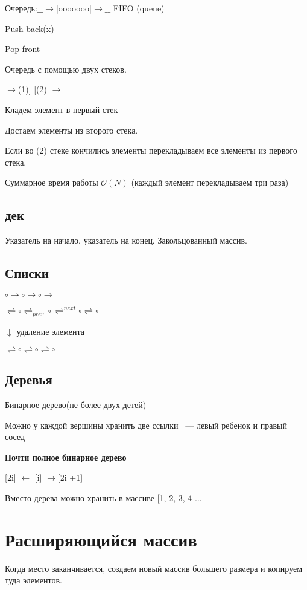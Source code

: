 \documentclass[12pt]{article}
\def\O{\mathcal{O}}
\begin{document}
Очередь:$\_\_\to$|ooooooo|$\to\_\_$  FIFO (queue)

Push$\_$back(x)

Pop$\_$front

Очередь с помощью двух стеков.

{$\to$}(1)]  [(2) $\to$


Кладем элемент в первый стек

Достаем элементы из второго стека. 

Если во (2) стеке  кончились элементы перекладываем все элементы из первого стека.

Суммарное время работы $\O(N)$ (каждый элемент перекладываем три раза)

\subsection{дек}

Указатель на начало, указатель на конец. Закольцованный массив.

\subsection{Списки}

$\circ \to \circ \to \circ \to$

$\rightleftharpoons \circ \rightleftharpoons_{prev} \circ \rightleftharpoons^{next} \circ \rightleftharpoons \circ$

$\downarrow$ удаление элемента

$\rightleftharpoons \circ \rightleftharpoons \circ \rightleftharpoons \circ$

\subsection{Деревья}
Бинарное дерево(не более двух детей)


Можно у каждой вершины хранить две ссылки ~--- левый ребенок и правый сосед

{\bf Почти полное бинарное дерево}

[2i] $\gets$ [i] $\to$[2i  +1]

Вместо дерева можно хранить в массиве [1, 2, 3, 4 $\ldots$

\section{Расширяющийся массив}

Когда место заканчивается, создаем новый массив большего размера и копируем туда элементов.
\end{document}
